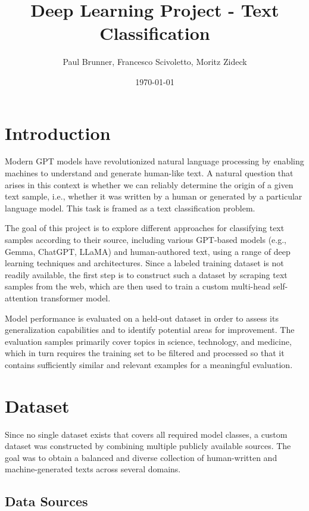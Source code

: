 \documentclass[11pt,a4paper]{article}
\title{Deep Learning Project - Text Classification}
\author{Paul Brunner, Francesco Scivoletto, Moritz Zideck}
\date{\today}
\begin{document}
\maketitle

\tableofcontents
\newpage

\section{Introduction}
    Modern GPT models have revolutionized natural language processing by enabling machines to understand and generate human-like text.
    A natural question that arises in this context is whether we can reliably determine the origin of a given text sample, i.e., whether it was written by a human or generated by a particular language model.
    This task is framed as a text classification problem.

    The goal of this project is to explore different approaches for classifying text samples according to their source, including various GPT-based models (e.g., Gemma, ChatGPT, LLaMA) and human-authored text, using a range of deep learning techniques and architectures.
     Since a labeled training dataset is not readily available, the first step is to construct such a dataset by scraping text samples from the web, which are then used to train a custom multi-head self-attention transformer model.

    Model performance is evaluated on a held-out dataset in order to assess its generalization capabilities and to identify potential areas for improvement.
    The evaluation samples primarily cover topics in science, technology, and medicine, which in turn requires the training set to be filtered and processed so that it contains sufficiently similar and relevant examples for a meaningful evaluation.

\section{Dataset}

Since no single dataset exists that covers all required model classes, a custom dataset was constructed by combining multiple publicly available sources. The goal was to obtain a balanced and diverse collection of human-written and machine-generated texts across several domains.

\subsection{Data Sources}
\end{document}
